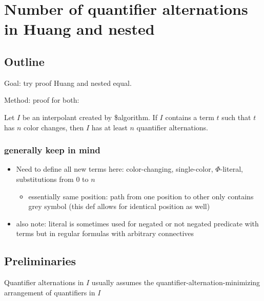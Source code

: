 \documentclass[,%
	draft=false,%
	numbers=noendperiod
	12pt,
	a4paper,
	oneside,%
	openany,
]{memoir}
\begin{document}
\chapter{ Number of quantifier alternations in Huang and nested }

\section{ Outline }

Goal: try proof Huang and nested equal.

Method: proof for both:

\begin{cprop}
	Let $I$ be an interpolant created by \$algorithm.
	If $I$ contains a term $t$ such that $t$ has $n$ color changes, then $I$ has at least $n$ quantifier alternations.
\end{cprop}

\subsection{generally keep in mind}

\begin{itemize}
	\item Need to define all new terms here: color-changing, single-color, $\Phi$-literal, substitutions from $0$ to $n$
		\begin{itemize}
			\item essentially same position: path from one position to other only contains grey symbol (this def allows for identical position as well)
		\end{itemize}
	\item also note: literal is sometimes used for negated or not negated predicate with terms but in regular formulas with arbitrary connectives
\end{itemize}

\section{ Preliminaries }

Quantifier alternations in $I$ usually assumes the quantifier-alternation-minimizing arrangement of quantifiers in $I$ 
\end{document}
